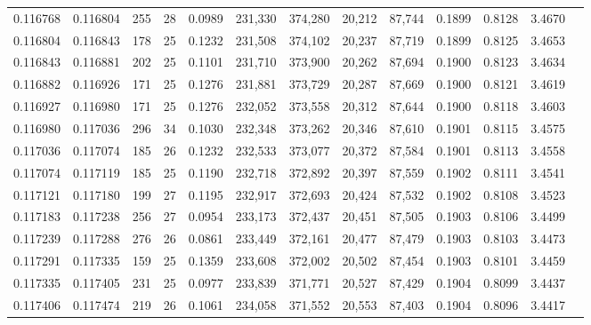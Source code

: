 \begin{tabular}{rrrrrrrrrrrrr}
0.116768 & 0.116804 & 255 &  28 &                                     0.0989 & 231,330 & 374,280 &  20,212 &  87,744 & 0.1899 & 0.8128 & 3.4670 \\
0.116804 & 0.116843 & 178 &  25 &                                     0.1232 & 231,508 & 374,102 &  20,237 &  87,719 & 0.1899 & 0.8125 & 3.4653 \\
0.116843 & 0.116881 & 202 &  25 &                                     0.1101 & 231,710 & 373,900 &  20,262 &  87,694 & 0.1900 & 0.8123 & 3.4634 \\
0.116882 & 0.116926 & 171 &  25 &                                     0.1276 & 231,881 & 373,729 &  20,287 &  87,669 & 0.1900 & 0.8121 & 3.4619 \\
0.116927 & 0.116980 & 171 &  25 &                                     0.1276 & 232,052 & 373,558 &  20,312 &  87,644 & 0.1900 & 0.8118 & 3.4603 \\
0.116980 & 0.117036 & 296 &  34 &                                     0.1030 & 232,348 & 373,262 &  20,346 &  87,610 & 0.1901 & 0.8115 & 3.4575 \\
0.117036 & 0.117074 & 185 &  26 &                                     0.1232 & 232,533 & 373,077 &  20,372 &  87,584 & 0.1901 & 0.8113 & 3.4558 \\
0.117074 & 0.117119 & 185 &  25 &                                     0.1190 & 232,718 & 372,892 &  20,397 &  87,559 & 0.1902 & 0.8111 & 3.4541 \\
0.117121 & 0.117180 & 199 &  27 &                                     0.1195 & 232,917 & 372,693 &  20,424 &  87,532 & 0.1902 & 0.8108 & 3.4523 \\
0.117183 & 0.117238 & 256 &  27 &                                     0.0954 & 233,173 & 372,437 &  20,451 &  87,505 & 0.1903 & 0.8106 & 3.4499 \\
0.117239 & 0.117288 & 276 &  26 &                                     0.0861 & 233,449 & 372,161 &  20,477 &  87,479 & 0.1903 & 0.8103 & 3.4473 \\
0.117291 & 0.117335 & 159 &  25 &                                     0.1359 & 233,608 & 372,002 &  20,502 &  87,454 & 0.1903 & 0.8101 & 3.4459 \\
0.117335 & 0.117405 & 231 &  25 &                                     0.0977 & 233,839 & 371,771 &  20,527 &  87,429 & 0.1904 & 0.8099 & 3.4437 \\
0.117406 & 0.117474 & 219 &  26 &                                     0.1061 & 234,058 & 371,552 &  20,553 &  87,403 & 0.1904 & 0.8096 & 3.4417 \\

\end{tabular}
